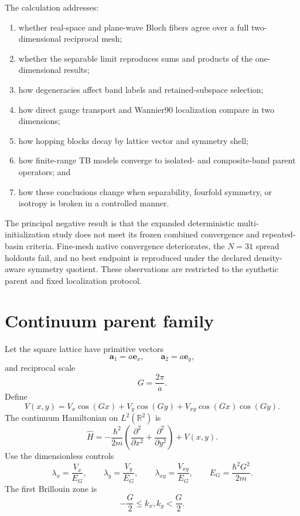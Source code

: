 The calculation addresses:
\begin{enumerate}
    \item whether real-space and plane-wave Bloch fibers agree over a full
          two-dimensional reciprocal mesh;
    \item whether the separable limit reproduces sums and products of the
          one-dimensional results;
    \item how degeneracies affect band labels and retained-subspace selection;
    \item how direct gauge transport and Wannier90 localization compare in two
          dimensions;
    \item how hopping blocks decay by lattice vector and symmetry shell;
    \item how finite-range TB models converge to isolated- and composite-band
          parent operators; and
    \item how these conclusions change when separability, fourfold symmetry,
          or isotropy is broken in a controlled manner.
\end{enumerate}

The principal negative result is that the expanded deterministic
multi-initialization study does not meet its frozen combined convergence and
repeated-basin criteria. Fine-mesh native convergence deteriorates, the
$N=31$ spread holdouts fail, and no best endpoint is reproduced under the
declared density-aware symmetry quotient. These observations are restricted to
the synthetic parent and fixed localization protocol.

\section{Continuum parent family}

Let the square lattice have primitive vectors
\begin{equation}
    \mathbf a_1=a\mathbf e_x,
    \qquad
    \mathbf a_2=a\mathbf e_y,
\end{equation}
and reciprocal scale
\begin{equation}
    G=\frac{2\pi}{a}.
\end{equation}
Define
\begin{equation}
    V(x,y)
    =
    V_x\cos(Gx)
    +
    V_y\cos(Gy)
    +
    V_{xy}\cos(Gx)\cos(Gy).
\end{equation}
The continuum Hamiltonian on $L^2(\mathbb R^2)$ is
\begin{equation}
    \hat H
    =
    -\frac{\hbar^2}{2m}
    \left(
        \frac{\partial^2}{\partial x^2}
        +
        \frac{\partial^2}{\partial y^2}
    \right)
    +
    V(x,y).
\end{equation}
Use the dimensionless controls
\begin{equation}
    \lambda_x=\frac{V_x}{E_G},
    \qquad
    \lambda_y=\frac{V_y}{E_G},
    \qquad
    \lambda_{xy}=\frac{V_{xy}}{E_G},
    \qquad
    E_G=\frac{\hbar^2G^2}{2m}.
\end{equation}
The first Brillouin zone is
\begin{equation}
    -\frac{G}{2}\leq k_x,k_y<\frac{G}{2}.
\end{equation}

